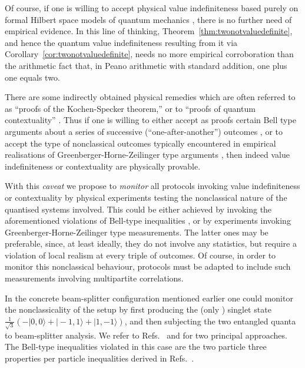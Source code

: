 \documentclass[%
 preprint,
 showpacs,
 showkeys,
 amsmath,
 amssymb,
 aps,
 pra,
 ]{revtex4-1}
\theoremstyle{definition}
\begin{document}
Of course, if one is willing to accept physical value indefiniteness
based purely on formal  Hilbert space models of quantum mechanics \cite{v-neumann-55},
there is no further need of empirical evidence.
In this line of thinking, Theorem~\ref{thm:twonotvaluedefinite}, and hence the quantum value indefiniteness resulting from it via Corollary~\ref{cor:twonotvaluedefinite}, needs no more empirical corroboration
than the arithmetic fact that, in Peano arithmetic with standard addition, one plus one equals two.



{\color{red}
There are some indirectly obtained physical remedies which are often referred to as
``proofs of the Kochen-Specker theorem,''
or to ``proofs of quantum contextuality''
\cite{hasegawa:230401,Bartosik-09,kirch-09,PhysRevLett.103.160405,Lapkiewicz-11}.
Thus if one is
willing to either accept as proofs certain Bell type arguments about a series of successive (``one-after-another'') outcomes \cite{PhysRevLett.103.160405},
or to accept the type of nonclassical outcomes typically encountered in
empirical realisations of Greenberger-Horne-Zeilinger type arguments \cite{PhysRevLett.82.1345,panbdwz},
then indeed value indefiniteness or contextuality are physically provable.



With this {\it caveat} we propose to {\em monitor} all protocols invoking value indefiniteness or contextuality by
physical experiments testing the nonclassical nature of the quantised systems involved.
This could be either achieved by invoking the aforementioned violations of Bell-type inequalities \cite{10.1038/nature09008}, or by
experiments invoking  Greenberger-Horne-Zeilinger type measurements.
The latter ones may be preferable, since, at least ideally, they do not involve any statistics,
but require a violation of local realism at every triple of outcomes.
Of course, in order to monitor this nonclassical behaviour, protocols must be adapted to
include such measurements involving multipartite correlations.


In the concrete beam-splitter configuration mentioned earlier one could monitor the nonclassicality of the setup
by first producing the (only \cite{schimpf-svozil}) singlet state
$\frac{1}{{\sqrt{3}}}\left(-|0,0\rangle+|-1,1\rangle+|1,-1\rangle\right)$,
and then subjecting the two entangled quanta to beam-splitter analysis.
We refer to Refs.~\cite{zukowski-97} and \cite{svozil-2004-analog} for two principal approaches.
The Bell-type inequalities violated in this case are the two particle  three properties per particle
inequalities derived in Refs.~\cite{2000-poly,collins-gisin-2003,sliwa-2003}.
}
\fi
\end{document}
